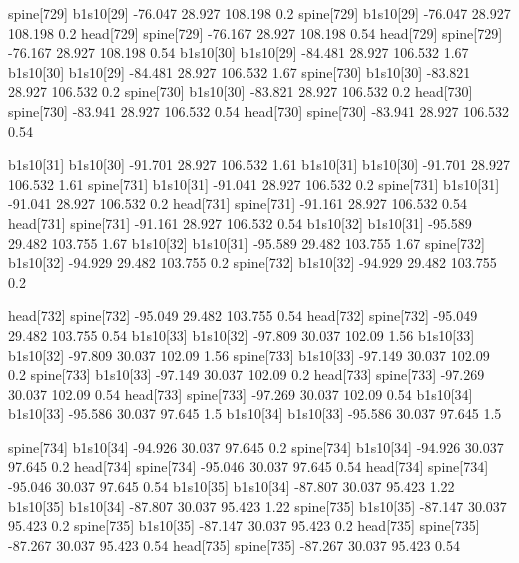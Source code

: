 spine[729]    b1s10[29]    -76.047    28.927    108.198    0.2
spine[729]    b1s10[29]    -76.047    28.927    108.198    0.2
head[729]    spine[729]    -76.167    28.927    108.198    0.54
head[729]    spine[729]    -76.167    28.927    108.198    0.54
b1s10[30]    b1s10[29]    -84.481    28.927    106.532    1.67
b1s10[30]    b1s10[29]    -84.481    28.927    106.532    1.67
spine[730]    b1s10[30]    -83.821    28.927    106.532    0.2
spine[730]    b1s10[30]    -83.821    28.927    106.532    0.2
head[730]    spine[730]    -83.941    28.927    106.532    0.54
head[730]    spine[730]    -83.941    28.927    106.532    0.54


b1s10[31]    b1s10[30]    -91.701    28.927    106.532    1.61
b1s10[31]    b1s10[30]    -91.701    28.927    106.532    1.61
spine[731]    b1s10[31]    -91.041    28.927    106.532    0.2
spine[731]    b1s10[31]    -91.041    28.927    106.532    0.2
head[731]    spine[731]    -91.161    28.927    106.532    0.54
head[731]    spine[731]    -91.161    28.927    106.532    0.54
b1s10[32]    b1s10[31]    -95.589    29.482    103.755    1.67
b1s10[32]    b1s10[31]    -95.589    29.482    103.755    1.67
spine[732]    b1s10[32]    -94.929    29.482    103.755    0.2
spine[732]    b1s10[32]    -94.929    29.482    103.755    0.2


head[732]    spine[732]    -95.049    29.482    103.755    0.54
head[732]    spine[732]    -95.049    29.482    103.755    0.54
b1s10[33]    b1s10[32]    -97.809    30.037    102.09    1.56
b1s10[33]    b1s10[32]    -97.809    30.037    102.09    1.56
spine[733]    b1s10[33]    -97.149    30.037    102.09    0.2
spine[733]    b1s10[33]    -97.149    30.037    102.09    0.2
head[733]    spine[733]    -97.269    30.037    102.09    0.54
head[733]    spine[733]    -97.269    30.037    102.09    0.54
b1s10[34]    b1s10[33]    -95.586    30.037    97.645    1.5
b1s10[34]    b1s10[33]    -95.586    30.037    97.645    1.5


spine[734]    b1s10[34]    -94.926    30.037    97.645    0.2
spine[734]    b1s10[34]    -94.926    30.037    97.645    0.2
head[734]    spine[734]    -95.046    30.037    97.645    0.54
head[734]    spine[734]    -95.046    30.037    97.645    0.54
b1s10[35]    b1s10[34]    -87.807    30.037    95.423    1.22
b1s10[35]    b1s10[34]    -87.807    30.037    95.423    1.22
spine[735]    b1s10[35]    -87.147    30.037    95.423    0.2
spine[735]    b1s10[35]    -87.147    30.037    95.423    0.2
head[735]    spine[735]    -87.267    30.037    95.423    0.54
head[735]    spine[735]    -87.267    30.037    95.423    0.54


